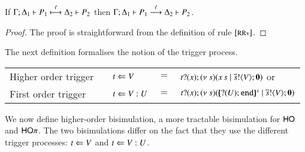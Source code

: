 \begin{lemma}[Invariant]\label{l:invariant}
	If $\Gamma; \Delta_1 \vdash P_1 \stackrel{\ell}{\longmapsto} \Delta_2 \vdash P_2$
	then $\Gamma; \Delta_1 \vdash P_1 \stackrel{\ell}{\longrightarrow} \Delta_2 \vdash P_2$.
\end{lemma}

\begin{proof}
	The proof is straightforward from the definition of rule ${\footnotesize [\textrm{RRv}]}$.
\end{proof}


The next definition formalises the notion of the trigger process.
%
\begin{definition}\rm
	\begin{center}
		\begin{tabular}{lclcl}
			Higher order trigger & & $t \Leftarrow V$ &$=$& $t ? (x) ; (\nu\ s)(x\,s \;|\; \overline{s} ! \langle V \rangle ; \mathbf{0})$ or\\
			First order trigger & & $t \Leftarrow V:U$ &$=$& $t ? (x) ; (\nu\ s)([\!\!(? (U) ; \mathtt{end})\!\!]^{s} \;|\; \overline{s} ! \langle V \rangle ; \mathbf{0})$
		\end{tabular}
	\end{center}
\end{definition}

 We now define 
higher-order bisimulation, 
a more tractable bisimulation for $\mathsf{HO}$ and $\mathsf{HO}\pi$.
The two bisimulations differ on the fact that
they use the different 
trigger processes: $t \Leftarrow V$ and $t \Leftarrow V:U$.

